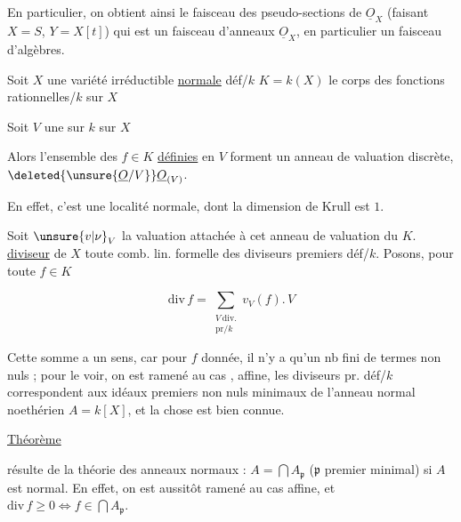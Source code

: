 En particulier, on obtient ainsi le faisceau des pseudo-sections de $\underline O_X$ (faisant $X=S$, $Y=X[t]$) qui est un faisceau d'anneaux \uline{} $\underline O_X$, en particulier un faisceau d'algèbres.





Soit $X$ une variété irréductible \uline{normale} déf/$k$ $K=k(X)$ le corps des fonctions rationnelles/$k$ sur $X$

Soit $V$ une  sur $k$ sur $X$

Alors l'ensemble des $f\in K$ \uline{définies} en $V$ forment un anneau de valuation discrète, $\deleted{\unsure{\underline O/V}}\underline O_{(V)}$.

En effet, c'est une  localité normale, dont la dimension de Krull est $1$.

Soit $\unsure{v|\nu}_V$ la valuation  attachée à cet anneau de valuation du $K$.  \uline{diviseur}  de $X$ toute comb. lin. formelle des diviseurs premiers  déf/$k$. Posons, pour toute $f\in K$

\[
\mathrm{div}\,f=\sum_{\substack{V\ \mathrm{div.}\\ \mathrm{pr}/k}}v_V(f).\,V
\]

Cette somme a un sens, car pour $f$ donnée, il n'y a qu'un nb fini de termes non nuls ;  pour le voir, on est ramené au cas , affine,  les diviseurs pr. déf/$k$ correspondent aux idéaux premiers non nuls minimaux de l'anneau normal noethérien $A=k[X]$, et la chose est bien connue.

\uline{Théorème}  

 résulte de la théorie des anneaux normaux : $A=\bigcap A_{\mathfrak p}$ ($\mathfrak p$ premier minimal) si $A$ est normal. En effet, on est aussitôt ramené au cas affine, et $\mathrm{div}\,f\geq0\Longleftrightarrow f\in\bigcap A_{\mathfrak p}$.

